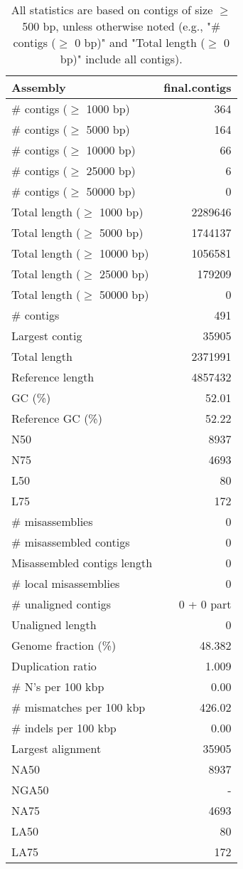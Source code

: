 \documentclass[12pt,a4paper]{article}
\begin{document}
\begin{table}[ht]
\begin{center}
\caption{All statistics are based on contigs of size $\geq$ 500 bp, unless otherwise noted (e.g., "\# contigs ($\geq$ 0 bp)" and "Total length ($\geq$ 0 bp)" include all contigs).}
\begin{tabular}{|l*{1}{|r}|}
\hline
Assembly & final.contigs \\ \hline
\# contigs ($\geq$ 1000 bp) & 364 \\ \hline
\# contigs ($\geq$ 5000 bp) & 164 \\ \hline
\# contigs ($\geq$ 10000 bp) & 66 \\ \hline
\# contigs ($\geq$ 25000 bp) & 6 \\ \hline
\# contigs ($\geq$ 50000 bp) & 0 \\ \hline
Total length ($\geq$ 1000 bp) & 2289646 \\ \hline
Total length ($\geq$ 5000 bp) & 1744137 \\ \hline
Total length ($\geq$ 10000 bp) & 1056581 \\ \hline
Total length ($\geq$ 25000 bp) & 179209 \\ \hline
Total length ($\geq$ 50000 bp) & 0 \\ \hline
\# contigs & 491 \\ \hline
Largest contig & 35905 \\ \hline
Total length & 2371991 \\ \hline
Reference length & 4857432 \\ \hline
GC (\%) & 52.01 \\ \hline
Reference GC (\%) & 52.22 \\ \hline
N50 & 8937 \\ \hline
N75 & 4693 \\ \hline
L50 & 80 \\ \hline
L75 & 172 \\ \hline
\# misassemblies & 0 \\ \hline
\# misassembled contigs & 0 \\ \hline
Misassembled contigs length & 0 \\ \hline
\# local misassemblies & 0 \\ \hline
\# unaligned contigs & 0 + 0 part \\ \hline
Unaligned length & 0 \\ \hline
Genome fraction (\%) & 48.382 \\ \hline
Duplication ratio & 1.009 \\ \hline
\# N's per 100 kbp & 0.00 \\ \hline
\# mismatches per 100 kbp & 426.02 \\ \hline
\# indels per 100 kbp & 0.00 \\ \hline
Largest alignment & 35905 \\ \hline
NA50 & 8937 \\ \hline
NGA50 & - \\ \hline
NA75 & 4693 \\ \hline
LA50 & 80 \\ \hline
LA75 & 172 \\ \hline
\end{tabular}
\end{center}
\end{table}
\end{document}
